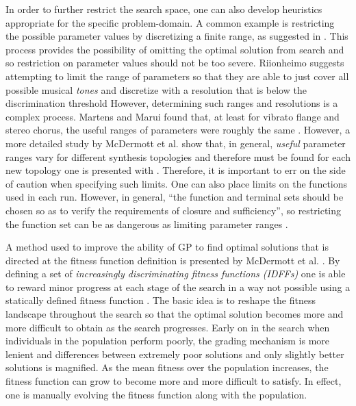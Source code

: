 \documentclass[a4paper,12pt]{report} 	%
\numberwithin{figure}{chapter}
\numberwithin{table}{chapter}
\numberwithin{equation}{chapter}
\begin{document}
\begin{flushleft}
In order to further restrict the search space, one can also develop heuristics appropriate for the specific problem-domain. A common example is restricting the possible parameter values by discretizing a finite range, as suggested in \cite[p. 6]{Riionheimo:2003qo}. This process provides the possibility of omitting the optimal solution from search and so restriction on parameter values should not be too severe. Riionheimo suggests attempting to limit the range of parameters so that they are able to just cover all possible musical \emph{tones} and discretize with a resolution that is below the discrimination threshold \cite[p. 6]{Riionheimo:2003qo} However, determining such ranges and resolutions is a complex process. Martens and Marui found that, at least for vibrato flange and stereo chorus, the useful ranges of parameters were roughly the same \cite[p. 4]{Martens:2009lo}. However, a more detailed study by McDermott et al. show that, in general, \emph{useful} parameter ranges vary for different synthesis topologies and therefore must be found for each new topology one is presented with \cite[p. 5]{McDermott:2005xq}. Therefore, it is important to err on the side of caution when specifying such limits. One can also place limits on the functions used in each run. However, in general, ``the function and terminal sets should be chosen so as to verify the requirements of closure and sufficiency'', so restricting the function set can be as dangerous as limiting parameter ranges \cite[p. 22]{Vanneschi:2004le}. 

A method used to improve the ability of GP to find optimal solutions that is directed at the fitness function definition is presented by McDermott et al. \cite{McDermott:2006ud}. By defining a set of \emph{increasingly discriminating fitness functions (IDFFs)} one is able to reward minor progress at each stage of the search in a way not possible using a statically defined fitness function \cite[p. 15]{2006ud}. The basic idea is to reshape the fitness landscape throughout the search so that the optimal solution becomes more and more difficult to obtain as the search progresses. Early on in the search when individuals in the population perform poorly, the grading mechanism is more lenient and differences between extremely poor solutions and only slightly better solutions is magnified. As the mean fitness over the population increases, the fitness function can grow to become more and more difficult to satisfy. In effect, one is manually evolving the fitness function along with the population.


\end{flushleft}
\end{document}
